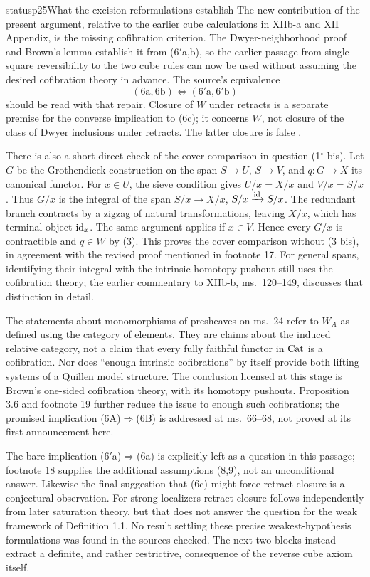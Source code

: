 \begin{dcomment}{status}{p25}{What the excision reformulations establish}
The new contribution of the present argument, relative to the earlier cube calculations in XIIb-a and XII Appendix, is the missing cofibration criterion. The Dwyer-neighborhood proof and Brown's lemma establish it from (6$'$a,b), so the earlier passage from single-square reversibility to the two cube rules can now be used without assuming the desired cofibration theory in advance. The source's equivalence
\[
(6\mathrm{a},6\mathrm{b})\Longleftrightarrow(6'\mathrm{a},6'\mathrm{b})
\]
should be read with that repair. Closure of $W$ under retracts is a separate premise for the converse implication to (6c); it concerns $W$, not closure of the class of Dwyer inclusions under retracts. The latter closure is false \citep[pp.~228--229]{Cisinski1999Dwyer}.

There is also a short direct check of the cover comparison in question (1$^\circ$ bis). Let $G$ be the Grothendieck construction on the span $S\to U$, $S\to V$, and $q:G\to X$ its canonical functor. For $x\in U$, the sieve condition gives $U/x=X/x$ and $V/x=S/x$. Thus $G/x$ is the integral of the span $S/x\to X/x$, $S/x\xrightarrow{\mathrm{id}}S/x$. The redundant branch contracts by a zigzag of natural transformations, leaving $X/x$, which has terminal object $\mathrm{id}_x$. The same argument applies if $x\in V$. Hence every $G/x$ is contractible and $q\in W$ by (3). This proves the cover comparison without (3 bis), in agreement with the revised proof mentioned in footnote 17. For general spans, identifying their integral with the intrinsic homotopy pushout still uses the cofibration theory; the earlier commentary to XIIb-b, ms.~120--149, discusses that distinction in detail.

The statements about monomorphisms of presheaves on ms.~24 refer to $W_A$ as defined using the category of elements. They are claims about the induced relative category, not a claim that every fully faithful functor in $\mathrm{Cat}$ is a cofibration. Nor does ``enough intrinsic cofibrations'' by itself provide both lifting systems of a Quillen model structure. The conclusion licensed at this stage is Brown's one-sided cofibration theory, with its homotopy pushouts. Proposition 3.6 and footnote 19 further reduce the issue to enough such cofibrations; the promised implication (6A)$\Rightarrow$(6B) is addressed at ms.~66--68, not proved at its first announcement here.

The bare implication (6$'$a)$\Rightarrow$(6a) is explicitly left as a question in this passage; footnote 18 supplies the additional assumptions (8,9), not an unconditional answer. Likewise the final suggestion that (6c) might force retract closure is a conjectural observation. For strong localizers retract closure follows independently from later saturation theory, but that does not answer the question for the weak framework of Definition 1.1. No result settling these precise weakest-hypothesis formulations was found in the sources checked. The next two blocks instead extract a definite, and rather restrictive, consequence of the reverse cube axiom itself.
\end{dcomment}


